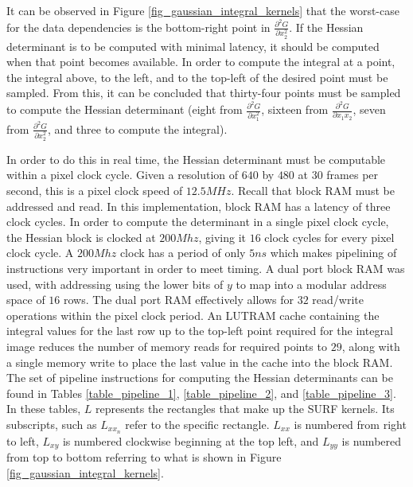 \documentclass[sigconf]{acmart/acmart}
\begin{document}
It can be observed in Figure \ref{fig_gaussian_integral_kernels} that the worst-case for the data dependencies is the bottom-right point in $\frac{\partial^2 G}{\partial x_2^2}$. If the Hessian determinant is to be computed with minimal latency, it should be computed when that point becomes available. In order to compute the integral at a point, the integral above, to the left, and to the top-left of the desired point must be sampled. From this, it can be concluded that thirty-four points must be sampled to compute the Hessian determinant (eight from $\frac{\partial^2 G}{\partial x_1^2}$, sixteen from $\frac{\partial^2 G}{\partial x_1 x_2}$, seven from $\frac{\partial^2 G}{\partial x_2^2}$, and three to compute the integral). 

In order to do this in real time, the Hessian determinant must be computable within a pixel clock cycle. Given a resolution of $640$ by $480$ at $30$ frames per second, this is a pixel clock speed of $12.5 MHz$. Recall that block RAM must be addressed and read. In this implementation, block RAM has a latency of three clock cycles. In order to compute the determinant in a single pixel clock cycle, the Hessian block is clocked at $200 Mhz$, giving it $16$ clock cycles for every pixel clock cycle. A $200 Mhz$ clock has a period of only $5ns$ which makes pipelining of instructions very important in order to meet timing. A dual port block RAM was used, with addressing using the lower bits of $y$ to map into a modular address space of $16$ rows. The dual port RAM effectively allows for $32$ read/write operations within the pixel clock period. An LUTRAM cache containing the integral values for the last row up to the top-left point required for the integral image reduces the number of memory reads for required points to $29$, along with a single memory write to place the last value in the cache into the block RAM. The set of pipeline instructions for computing the Hessian determinants can be found in Tables \ref{table_pipeline_1}, \ref{table_pipeline_2}, and \ref{table_pipeline_3}. In these tables, $L$ represents the rectangles that make up the SURF kernels. Its subscripts, such as $L_{xx_n}$ refer to the specific rectangle. $L_{xx}$ is numbered from right to left, $L_{xy}$ is numbered clockwise beginning at the top left, and $L_{yy}$ is numbered from top to bottom referring to what is shown in Figure \ref{fig_gaussian_integral_kernels}.
\end{document}
